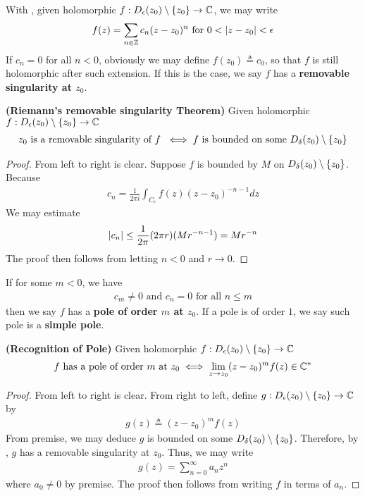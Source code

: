 \documentclass{report}
\begin{document}
\begin{mdframed}
With , given holomorphic $f:D_\epsilon (z_0)\setminus \{ z_0 \}\rightarrow \mathbb{C}$, we may write 
\begin{align*}
f(z)= \sum_{n\in\mathbb{Z}} c_n (z-z_0)^n\text{ for } 0<\left|z-z_0\right|< \epsilon 
\end{align*}
If $c_n=0$ for all $n<0$, obviously we may define  $f(z_0)\triangleq c_0$, so that $f$ is still holomorphic after such extension. If this is the case, we say $f$ has a  \textbf{removable singularity at $z_0$}.     
\end{mdframed}
\begin{theorem}
\label{RoRS}
\textbf{(Riemann's removable singularity Theorem)} Given holomorphic $f:D_\epsilon (z_0)\setminus \{ z_0 \}\rightarrow \mathbb{C}$ 
\begin{align*}
z_0\text{ is a removable singularity of $f$ }\iff f\text{ is bounded on some }D_\delta (z_0)\setminus \{ z_0 \}
\end{align*}
\end{theorem}
\begin{proof}
From left to right is clear. Suppose $f$ is bounded by $M$ on $D_\delta(z_0)\setminus \{ z_0 \}$. Because 
\begin{align*}
c_n=\frac{1}{2\pi  i}\int_{C_r}f(z)(z-z_0)^{-n-1}dz
\end{align*}
We may estimate 
\begin{align*}
  \left|c_n\right|\leq \frac{1}{2\pi }(2\pi r )( M r^{-n-1})= Mr^{-n}
\end{align*}
The proof then follows from letting $n<0$ and $r \to 0$. 
\end{proof}
\begin{mdframed}
If for some $m<0$, we have  
 \begin{align*}
c_m \neq 0\text{ and }c_n=0\text{ for all }n\leq m
\end{align*}
then we say $f$ has a  \textbf{pole of order $m$ at  $z_0$}. If a pole is of order $1$, we say such pole is a  \textbf{simple pole}.  
\end{mdframed}
\begin{theorem}
\textbf{(Recognition of Pole)} Given holomorphic $f:D_\epsilon (z_0)\setminus \{ z_0 \}\rightarrow \mathbb{C}$ 
\begin{align*}
f\text{ has a pole of order }m\text{ at }z_0\iff \lim_{z\to z_0}(z-z_0)^mf(z)\in\mathbb{C}^*
\end{align*}
\end{theorem}
\begin{proof}
From left to right is clear. From right to left, define $g:D_\epsilon (z_0)\setminus \{ z_0 \}\rightarrow \mathbb{C}$ by 
\begin{align*}
g(z)\triangleq (z-z_0)^m f(z)
\end{align*}
From premise, we may deduce $g$ is bounded on some  $D_\delta(z_0)\setminus \{ z_0 \}$. Therefore, by , $g$ has a removable singularity at $z_0$. Thus, we may write 
 \begin{align*}
g(z)=\sum_{n=0}^{\infty}a_n z^n
\end{align*}
where $a_0\neq 0$ by premise. The proof then follows from writing $f$ in terms of $a_n$.  
\end{proof}
\end{document}
